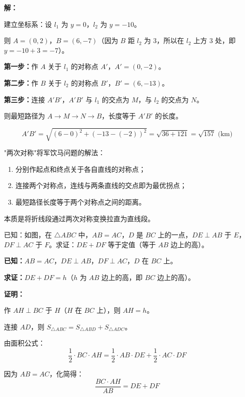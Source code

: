 \documentclass[12pt, a4paper]{ctexart}
\begin{document}
\textbf{解：}

建立坐标系：设 $l_1$ 为 $y = 0$，$l_2$ 为 $y = -10$。

则 $A = (0, 2)$，$B = (6, -7)$（因为 $B$ 距 $l_2$ 为 $3$，所以在 $l_2$ 上方 $3$ 处，即 $y = -10 + 3 = -7$）。

\textbf{第一步：}作 $A$ 关于 $l_1$ 的对称点 $A'$，$A' = (0, -2)$。

\textbf{第二步：}作 $B$ 关于 $l_2$ 的对称点 $B'$，$B' = (6, -13)$。

\textbf{第三步：}连接 $A'B'$，$A'B'$ 与 $l_1$ 的交点为 $M$，与 $l_2$ 的交点为 $N$。

则最短路径为 $A \to M \to N \to B$，长度等于 $A'B'$ 的长度。

$$A'B' = \sqrt{(6-0)^2 + (-13-(-2))^2} = \sqrt{36 + 121} = \sqrt{157} \text{ (km)}$$

\begin{tipbox}[方法总结]
"两次对称"将军饮马问题的解法：
\begin{enumerate}[nosep]
  \item 分别作起点和终点关于各自直线的对称点；
  \item 连接两个对称点，连线与两条直线的交点即为最优拐点；
  \item 最短路径长度等于两个对称点之间的距离。
\end{enumerate}
本质是将折线段通过两次对称变换拉直为直线段。
\end{tipbox}

\begin{examplebox}
已知：如图，在 $\triangle ABC$ 中，$AB = AC$，$D$ 是 $BC$ 上的一点，$DE \perp AB$ 于 $E$，$DF \perp AC$ 于 $F$。求证：$DE + DF$ 等于定值（等于 $AB$ 边上的高）。
\end{examplebox}

\textbf{已知：}$AB = AC$，$DE \perp AB$，$DF \perp AC$，$D$ 在 $BC$ 上。

\textbf{求证：}$DE + DF = h$（$h$ 为 $AB$ 边上的高，即 $BC$ 边上的高）。

\textbf{证明：}

作 $AH \perp BC$ 于 $H$（$H$ 在 $BC$ 上），则 $AH = h$。

连接 $AD$，则 $S_{\triangle ABC} = S_{\triangle ABD} + S_{\triangle ADC}$。

由面积公式：
$$\frac{1}{2} \cdot BC \cdot AH = \frac{1}{2} \cdot AB \cdot DE + \frac{1}{2} \cdot AC \cdot DF$$

因为 $AB = AC$，化简得：
$$\frac{BC \cdot AH}{AB} = DE + DF$$
\end{document}
